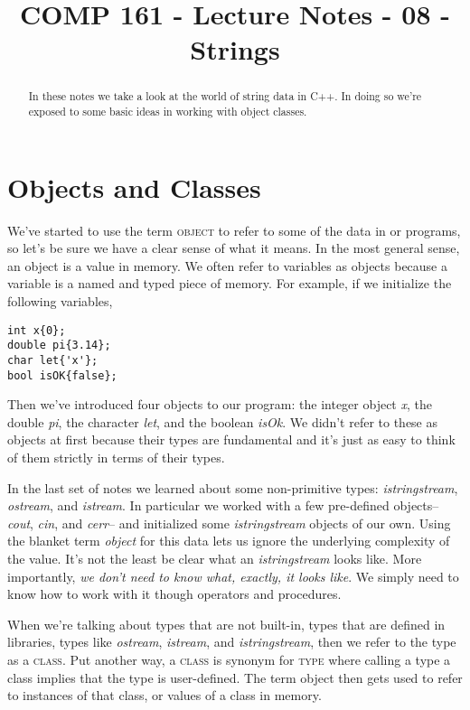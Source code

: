 \documentclass[]{tufte-handout}
\title{COMP 161 - Lecture Notes - 08 - Strings}
\begin{document}
 
\maketitle

\begin{abstract}
In these notes we take a look at the world of string data in C++.  In doing so we're exposed to some basic ideas in working with object classes.
\end{abstract}

\section{Objects and Classes}

We've started to use the term \textsc{object} to refer to some of the data in or programs, so let's be sure we have a clear sense of what it means.  In the most general sense, an object is a value in memory. We often refer to variables as objects because a variable is a named and typed piece of memory. For example, if we initialize the following variables,
\begin{verbatim}
int x{0};
double pi{3.14};
char let{'x'};
bool isOK{false};
\end{verbatim} 
Then we've introduced four objects to our program: the integer object \textit{x}, the double \textit{pi}, the character \textit{let}, and the boolean \textit{isOk}.  We didn't refer to these as objects at first because their types are fundamental and it's just as easy to think of them strictly in terms of their types.  

In the last set of notes we learned about some non-primitive types: \textit{istringstream}, \textit{ostream}, and \textit{istream}.  In particular we worked with a few pre-defined objects-- \textit{cout}, \textit{cin}, and \textit{cerr}-- and initialized some \textit{istringstream} objects of our own. Using the blanket term \textit{object} for this data lets us ignore the underlying complexity of the value. It's not the least be clear what an \textit{istringstream} looks like. More importantly, \textit{we don't need to know what, exactly, it looks like}. We simply need to know how to work with it though operators and procedures. 

When we're talking about types that are not built-in, types that are defined in libraries, types like \textit{ostream}, \textit{istream}, and \textit{istringstream}, then we refer to the type as a \textsc{class}.  Put another way, a \textsc{class} is synonym for \textsc{type} where calling a type a class implies that the type is user-defined.  The term object then gets used to refer to instances of that class, or values of a class in memory. 
\end{document}
